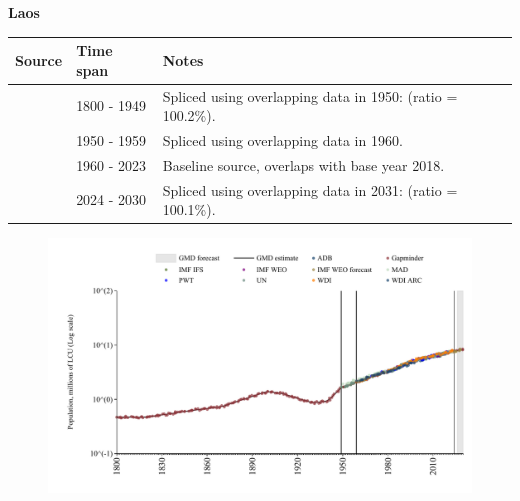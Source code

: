\documentclass[12pt,a4paper,landscape]{article}
\begin{document}
\begin{adjustbox}{max totalsize={\paperwidth}{\paperheight},center}
\begin{minipage}[t][\textheight][t]{\textwidth}
\vspace*{0.5cm}
{}
\begin{center}
{\Large\bfseries Laos}
\end{center}
\vspace{0.5cm}
\begin{table}[H]
\centering
\small
\begin{tabular}{|l|l|l|}
\hline
\textbf{Source} & \textbf{Time span} & \textbf{Notes} \\
\hline
\rowcolor{white}\cite{Gapminder}& 1800 - 1949 &Spliced using overlapping data in 1950: (ratio = 100.2\%).\\
\rowcolor{lightgray}\cite{IMF_IFS}& 1950 - 1959 &Spliced using overlapping data in 1960.\\
\rowcolor{white}\cite{WDI}& 1960 - 2023 &Baseline source, overlaps with base year 2018.\\
\rowcolor{lightgray}\cite{Gapminder}& 2024 - 2030 &Spliced using overlapping data in 2031: (ratio = 100.1\%).\\
\hline
\end{tabular}
\end{table}
\begin{figure}[H]
\centering
\includegraphics[width=\textwidth,height=0.6\textheight,keepaspectratio]{graphs/LAO_pop.pdf}
\end{figure}
\end{minipage}
\end{adjustbox}
\end{document}
